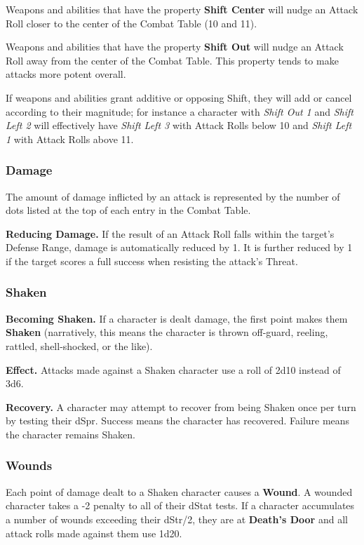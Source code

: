 \documentclass[10pt,twoside,twocolumn,openany]{book}
\begin{document}
Weapons and abilities that have the property \textbf{Shift Center} will nudge an Attack Roll closer to the center of the Combat Table (10 and 11).

Weapons and abilities that have the property \textbf{Shift Out} will nudge an Attack Roll away from the center of the Combat Table. This property tends to make attacks more potent overall.

If weapons and abilities grant additive or opposing Shift, they will add or cancel according to their magnitude; for instance a character with \textit{Shift Out 1} and \textit{Shift Left 2} will effectively have \textit{Shift Left 3} with Attack Rolls below 10 and \textit{Shift Left 1} with Attack Rolls above 11.

\subsubsection{Damage}
The amount of damage inflicted by an attack is represented by the number of dots listed at the top of each entry in the Combat Table.

\textbf{Reducing Damage.} If the result of an Attack Roll falls within the target's Defense Range, damage is automatically reduced by 1. It is further reduced by 1 if the target scores a full success when resisting the attack's Threat.

\subsubsection{Shaken}
\textbf{Becoming Shaken.} If a character is dealt damage, the first point makes them \textbf{Shaken} (narratively, this means the character is thrown off-guard, reeling, rattled, shell-shocked, or the like).

\textbf{Effect.} Attacks made against a Shaken character use a roll of 2d10 instead of 3d6.

\textbf{Recovery.} A character may attempt to recover from being Shaken once per turn by testing their dSpr. Success means the character has recovered. Failure means the character remains Shaken.

\subsubsection{Wounds}
Each point of damage dealt to a Shaken character causes a \textbf{Wound}. A wounded character takes a -2 penalty to all of their dStat tests. If a character accumulates a number of wounds exceeding their dStr/2, they are at \textbf{Death's Door} and all attack rolls made against them use 1d20.
\end{document}

